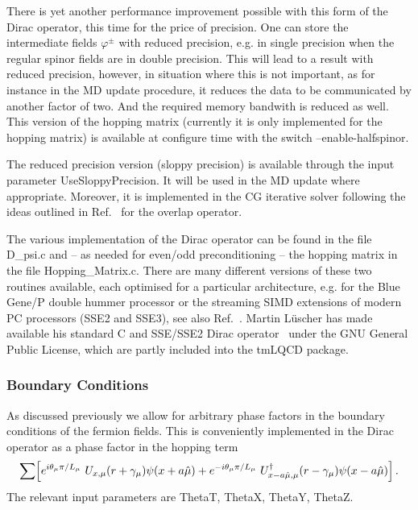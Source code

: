 There is yet another performance improvement possible with this form
of the Dirac operator, this time for the price of precision. One can
store the intermediate fields $\varphi^\pm$ with reduced precision,
e.g. in single precision when the regular spinor fields are in double
precision. This will lead to a result with reduced precision, however,
in situation where this is not important, as for instance in the MD
update procedure, it reduces the data to be communicated by another
factor of two. And the required memory bandwith is reduced as well.
This version of the hopping matrix (currently it is only implemented
for the hopping matrix) is available at configure time with the switch
{\ttfamily --enable-halfspinor}. 

The reduced precision version (sloppy precision) is available through
the input parameter {\ttfamily UseSloppyPrecision}. It will be used in
the MD update where appropriate. Moreover, it is implemented in the CG
iterative solver following the ideas outlined in
Ref.~\cite{Chiarappa:2006hz} for the overlap operator.

The various implementation of the Dirac operator can be found in the
file {\ttfamily D\_psi.c} and -- as needed for even/odd
preconditioning -- the hopping matrix in the file {\ttfamily
  Hopping\_Matrix.c}. There are many different versions of these two
routines available, each optimised for a particular architecture,
e.g. for the Blue Gene/P double hummer processor or the streaming SIMD
extensions of modern PC processors (SSE2 and SSE3), see also
Ref.~\cite{Luscher:2001tx}. Martin L{\"u}scher has made available his
standard C and SSE/SSE2 Dirac operator~\cite{Luscher:sse} under the
GNU General Public License, which are partly included into the tmLQCD
package.

\subsubsection{Boundary Conditions}

As discussed previously we allow for arbitrary phase factors in the
boundary conditions of the fermion fields. This is conveniently
implemented in the Dirac operator as a phase factor in the hopping
term
\[
\sum \Bigl[
    e^{i\theta_\mu \pi/L_\mu}\ U_{x,\mu}(r+\gamma_\mu)
    \psi(x+a\hat\mu)  + e^{-i\theta_\mu \pi/L_\mu}\
    U^\dagger_{x-a\hat\mu,\mu} 
    (r-\gamma_\mu)\psi(x-a\hat\mu)\Bigr]\, .
\]
The relevant input parameters are {\ttfamily ThetaT}, {\ttfamily
  ThetaX}, {\ttfamily ThetaY}, {\ttfamily ThetaZ}. 

